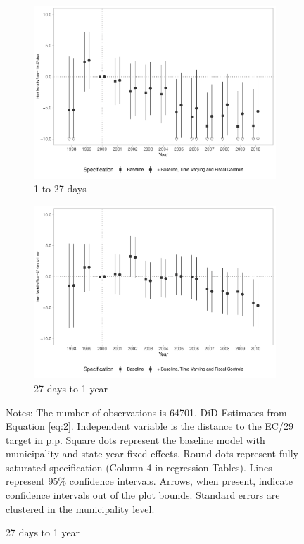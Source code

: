 \begin{figure}[h!]
\begin{center}
    \begin{subfigure}{0.48\textwidth}
        \centering
        \caption{\scriptsize 1 to 27 days}\label{fig:17c}
        \includegraphics[width=\textwidth]{plots/tx_mi_27d_dist_ec29_baseline_dist_ec29_baseline_17.pdf}
    \end{subfigure}
    \begin{subfigure}{0.48\textwidth}
        \centering
        \caption{\scriptsize 27 days to 1 year}\label{fig:17d}
        \includegraphics[width=\textwidth]{plots/tx_mi_ano_dist_ec29_baseline_dist_ec29_baseline_17.pdf}
    \end{subfigure}
    
    \end{center}
    
            \scriptsize{Notes: The number of observations is 64701. DiD Estimates from Equation \ref{eq:2}. Independent variable is the distance to the EC/29 target in p.p. Square dots represent the baseline model with municipality and state-year fixed effects. Round dots represent fully saturated specification (Column 4 in regression Tables). Lines represent 95\% confidence intervals. Arrows, when present, indicate confidence intervals out of the plot bounds. Standard errors are clustered in the municipality level.}
    
\end{figure}